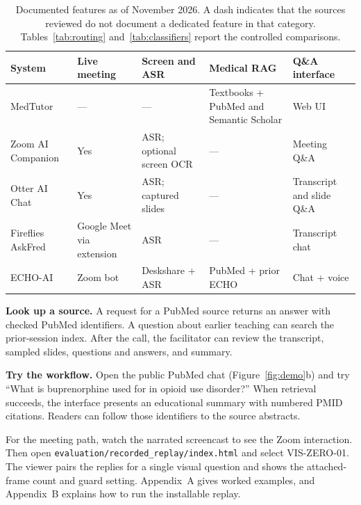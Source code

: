 \documentclass[11pt]{article}
\begin{document}
\begin{table}[t]\centering\small\setlength{\tabcolsep}{3pt}

\begin{tabularx}{\textwidth}{@{}p{}p{}p{}p{}X@{}}\toprule

\textbf{System} & \textbf{Live meeting} & \textbf{Screen and ASR} & \textbf{Medical RAG} & \textbf{Q\&A interface}\\\midrule

MedTutor & --- & --- & Textbooks + PubMed and Semantic Scholar & Web UI\\

Zoom AI Companion & Yes & ASR; optional screen OCR & --- & Meeting Q\&A\\

Otter AI Chat & Yes & ASR; captured slides & --- & Transcript and slide Q\&A\\

Fireflies AskFred & Google Meet via extension & ASR & --- & Transcript chat\\

ECHO-AI & Zoom bot & Deskshare + ASR & PubMed + prior ECHO & Chat + voice\\

\bottomrule\end{tabularx}

\caption{Documented features as of November 2026. A dash indicates that the sources reviewed do not document a dedicated feature in that category. Tables~\ref{tab:routing} and~\ref{tab:classifiers} report the controlled comparisons.}\end{table}

\textbf{Look up a source.} A request for a PubMed source returns an answer with checked PubMed identifiers. A question about earlier teaching can search the prior-session index. After the call, the facilitator can review the transcript, sampled slides, questions and answers, and summary.

\textbf{Try the workflow.} Open the public PubMed chat (Figure~\ref{fig:demo}b) and try ``What is buprenorphine used for in opioid use disorder?'' When retrieval succeeds, the interface presents an educational summary with numbered PMID citations. Readers can follow those identifiers to the source abstracts.

For the meeting path, watch the narrated screencast to see the Zoom interaction. Then open \nolinkurl{evaluation/recorded_replay/index.html} and select VIS-ZERO-01. The viewer pairs the replies for a single visual question and shows the attached-frame count and guard setting. Appendix~A gives worked examples, and Appendix~B explains how to run the installable replay.
\end{document}
